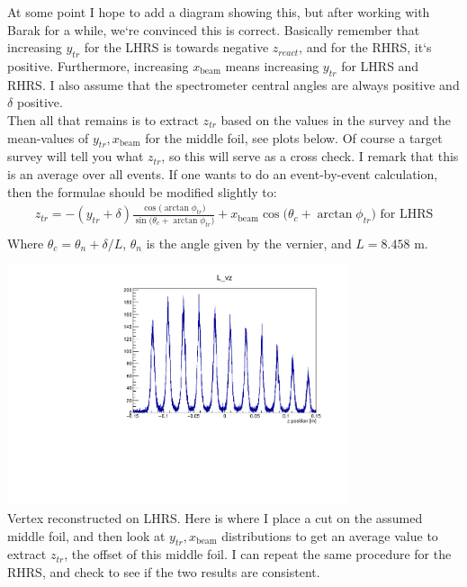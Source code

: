 \documentclass{article}
\begin{document}
At some point I hope to add a diagram showing this, but after working with Barak for a while, we`re convinced this is correct. Basically remember that increasing $y_{tr}$ for the LHRS is towards negative $z_{react}$, and for the RHRS, it`s positive. Furthermore, increasing $x_\textrm{beam}$ means increasing $y_{tr}$ for LHRS and RHRS. I also assume that the spectrometer central angles are always positive and $\delta$ positive.\\

Then all that remains is to extract $z_{tr}$ based on the values in the survey and the mean-values of $y_{tr} , x_\textrm{beam}$ for the middle foil, see plots below. Of course a target survey will tell you what $z_{tr}$, so this will serve as a cross check. I remark that this is an average over all events. If one wants to do an event-by-event calculation, then the formulae should be modified slightly to:
\begin{equation*}
	\begin{gathered}
		z_{tr} = -(y_{tr} + \delta) \frac{\cos{(\arctan{\phi_{tr})}}}{\sin{(\theta_c+\arctan{\phi_{tr})}}} + x_\textrm{beam} \cos{(\theta_c + \arctan{\phi_{tr})}}  \textrm{           for LHRS}\\
	\end{gathered}
\end{equation*}
Where $\theta_c = \theta_n + \delta/L$, $\theta_n$ is the angle given by the vernier, and $L = 8.458$ m.\\

\begin{center}
\includegraphics[width=10cm]{zPos.pdf}\\
Vertex reconstructed on LHRS. Here is where I place a cut on the assumed middle foil, and then look at $y_{tr}, x_\textrm{beam}$ distributions to get an average value to extract $z_{tr}$, the offset of this middle foil. I can repeat the same procedure for the RHRS, and check to see if the two results are consistent.
\end{center}
\end{document}
